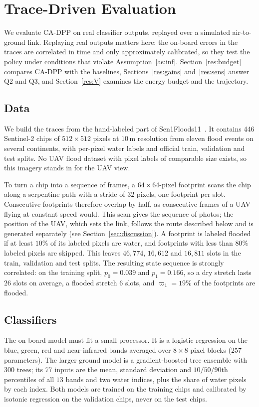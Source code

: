 \documentclass[journal]{IEEEtran}
\theoremstyle{remark}
\begin{document}
\section{Trace-Driven Evaluation}\label{sec:results}
We evaluate CA-DPP on real classifier outputs, replayed over a simulated air-to-ground link. Replaying real outputs matters here: the on-board errors in the traces are correlated in time and only approximately calibrated, so they test the policy under conditions that violate Assumption~\ref{as:inf}. Section~\ref{res:budget} compares CA-DPP with the baselines, Sections~\ref{res:gains} and~\ref{res:sens} answer Q2 and Q3, and Section~\ref{res:V} examines the energy budget and the trajectory.

\subsection{Data}
We build the traces from the hand-labeled part of Sen1Floods11~\cite{bonafilia2020sen1floods11}. It contains 446 Sentinel-2 chips of $512\times512$ pixels at $10$\,m resolution from eleven flood events on several continents, with per-pixel water labels and official train, validation and test splits. No UAV flood dataset with pixel labels of comparable size exists, so this imagery stands in for the UAV view.

To turn a chip into a sequence of frames, a $64\times64$-pixel footprint scans the chip along a serpentine path with a stride of $32$ pixels, one footprint per slot. Consecutive footprints therefore overlap by half, as consecutive frames of a UAV flying at constant speed would. This scan gives the sequence of photos; the position of the UAV, which sets the link, follows the route described below and is generated separately (see Section~\ref{sec:discussion}). A footprint is labeled flooded if at least $10\%$ of its labeled pixels are water, and footprints with less than $80\%$ labeled pixels are skipped. This leaves $46{,}774$, $16{,}612$ and $16{,}811$ slots in the train, validation and test splits. The resulting state sequence is strongly correlated: on the training split, $p_0=0.039$ and $p_1=0.166$, so a dry stretch lasts $26$ slots on average, a flooded stretch $6$ slots, and $\varpi_1=19\%$ of the footprints are flooded.

\subsection{Classifiers}
The on-board model must fit a small processor. It is a logistic regression on the blue, green, red and near-infrared bands averaged over $8\times8$ pixel blocks ($257$ parameters). The larger ground model is a gradient-boosted tree ensemble with $300$ trees; its $77$ inputs are the mean, standard deviation and $10/50/90$th percentiles of all $13$ bands and two water indices, plus the share of water pixels by each index. Both models are trained on the training chips and calibrated by isotonic regression on the validation chips, never on the test chips.
\end{document}
